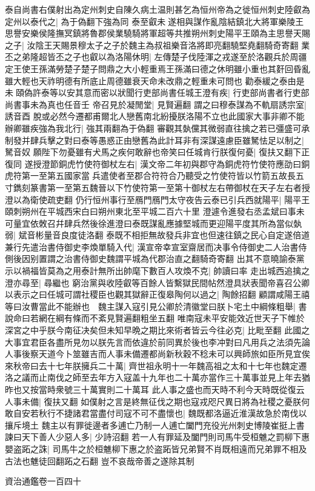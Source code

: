 泰自尚書右僕射出為定州刺史自陳久病土温則甚乞為恒州帝為之徙恒州刺史陸叡為定州以泰代之|{
	為于偽翻下強為同}
泰至叡未遂相與謀作亂陰結鎮北大將軍樂陵王思譽安樂侯隆撫冥鎮將魯郡侯業驍騎將軍超等共推朔州刺史陽平王頤為主思譽天賜之子|{
	汝陰王天賜景穆太子之子於魏主為叔祖樂音洛將即亮翻驍堅堯翻騎奇寄翻}
業丕之弟隆超皆丕之子也叡以為洛陽休明|{
	左傳楚子伐陸渾之戎遂至於洛觀兵於周疆定王使王孫滿勞楚子楚子問鼎之大小輕重焉王孫滿曰德之休明雖小重也其姧回昏亂雖大輕也天祚明德有所底止周德雖衰天命未改鼎之輕重未可問也}
勸泰緩之泰由是未頤偽許泰等以安其意而密以狀聞行吏部尚書任城王澄有疾|{
	行吏部尚書者行吏部尚書事未為真也任音壬}
帝召見於凝閒堂|{
	見賢遍翻}
謂之曰穆泰謀為不軌扇誘宗室|{
	誘音酉}
脫或必然今遷都甫爾北人戀舊南北紛擾朕洛陽不立也此國家大事非卿不能辦卿雖疾強為我北行|{
	強其兩翻為于偽翻}
審觀其埶儻其微弱直往擒之若已彊盛可承制發并肆兵擊之對曰泰等愚惑正由戀舊為此計耳非有深謀遠慮臣雖駑怯足以制之|{
	駑音奴}
願陛下勿憂雖有犬馬之疾何敢辭也帝笑曰任城肯行朕復何憂|{
	復扶又翻下正復同}
遂授澄節銅虎竹使符御杖左右|{
	漢文帝二年初與郡守為銅虎符竹使符應劭曰銅虎符第一至第五國家當兵遣使者至郡合符符合乃聽受之竹使符皆以竹箭五故長五寸鐫刻篆書第一至第五魏晉以下竹使符第一至第十御杖左右帶御杖在天子左右者授澄以為衛使疏吏翻}
仍行恒州事行至鴈門鴈門太守夜告云泰已引兵西就陽平|{
	陽平王頤刺朔州在平城西宋白曰朔州東北至平城二百六十里}
澄遽令進發右丞孟斌曰事未可量宜依敇召幷肆兵然後徐進澄曰泰既謀亂應據堅城而更迎陽平度其所為當似埶弱|{
	斌音彬量音良度徒洛翻}
泰既不相拒無故發兵非宜也但速往鎮之民心自定遂倍道兼行先遣治書侍御史李煥單騎入代|{
	漢宣帝幸宣室齋居而决事令侍御史二人治書侍側後因别置謂之治書侍御史魏謂平城為代郡治直之翻騎奇寄翻}
出其不意曉諭泰黨示以禍福皆莫為之用泰計無所出帥麾下數百人攻煥不克|{
	帥讀曰率}
走出城西追擒之澄亦尋至|{
	尋繼也}
窮治黨與收陸叡等百餘人皆繫獄民間帖然澄具狀表聞帝喜召公卿以表示之曰任城可謂社稷臣也觀其獄辭正復皋陶何以過之|{
	陶餘招翻}
顧謂咸陽王禧等曰汝曹當此不能辦也　魏主謀入寇引見公卿於清徽堂曰朕卜宅土中綱條粗舉|{
	書說命曰若網在綱有條而不紊見賢遍翻粗坐五翻}
唯南寇未平安能效近世天子下帷於深宮之中乎朕今南征决矣但未知早晩之期比來術者皆云今往必克|{
	比毗至翻}
此國之大事宜君臣各盡所見勿以朕先言而依違於前同異於後也李冲對曰凡用兵之法須先論人事後察天道今卜筮雖吉而人事未備遷都尚新秋穀不稔未可以興師旅如臣所見宜俟來秋帝曰去十七年朕擁兵二十萬|{
	齊世祖永明十一年魏高祖之太和十七年也魏定遷洛之議而止南伐之師至去年方入寇盖十九年也二十萬亦當作三十萬事並見上年去猶昨也又按當時衆號三十萬實則二十萬耳}
此人事之盛也而天時不利今天時既從復云人事未備|{
	復扶又翻}
如僕射之言是終無征伐之期也寇戎咫尺異日將為社稷之憂朕何敢自安若秋行不捷諸君當盡付司寇不可不盡懷也|{
	魏既都洛逼近淮漢故急於南伐以攘斥境土}
魏主以有罪徙邊者多逋亡乃制一人逋亡闔門充役光州刺史博陵崔挺上書諫曰天下善人少惡人多|{
	少詩沼翻}
若一人有罪延及闔門則司馬牛受桓魋之罰柳下惠嬰盗跖之誅|{
	司馬牛之於桓魋柳下惠之於盗跖皆兄弟賢不肖既相遠而兄弟罪不相及古法也魋徒回翻跖之石翻}
豈不哀哉帝善之遂除其制

資治通鑑卷一百四十
